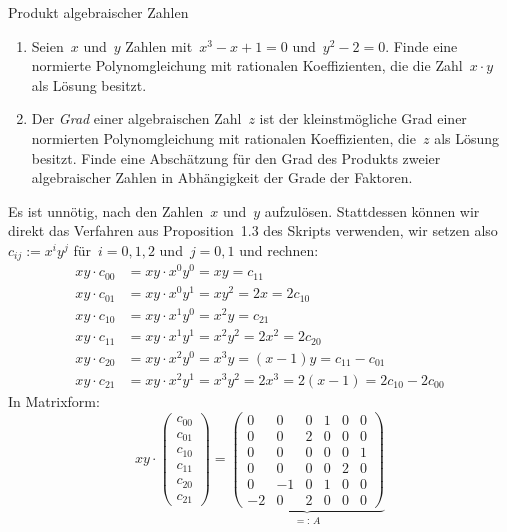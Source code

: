 \documentclass{algblatt}
\begin{document}
\begin{aufgabe}{Produkt algebraischer Zahlen}
\begin{enumerate}
\item Seien~$x$ und~$y$ Zahlen mit~$x^3-x+1=0$ und~$y^2-2=0$.
Finde eine normierte Polynomgleichung mit rationalen
Koeffizienten, die die Zahl~$x \cdot y$ als Lösung besitzt.
\item Der \emph{Grad} einer algebraischen Zahl~$z$ ist der kleinstmögliche Grad
einer normierten Polynomgleichung mit rationalen Koeffizienten, die~$z$ als Lösung
besitzt. Finde eine Abschätzung für den Grad des Produkts zweier algebraischer
Zahlen in Abhängigkeit der Grade der Faktoren.
\end{enumerate}
\begin{loesungE}
\item Es ist unnötig, nach den Zahlen~$x$ und~$y$ aufzulösen. Stattdessen
können wir direkt das Verfahren aus Proposition~1.3 des Skripts verwenden, wir
setzen also $c_{ij} := x^i y^j$ für~$i = 0,1,2$ und~$j = 0,1$ und rechnen:
\begin{align*}
  xy \cdot c_{00} &= xy \cdot x^0 y^0 = xy = c_{11} \\
  xy \cdot c_{01} &= xy \cdot x^0 y^1 = xy^2 = 2x = 2 c_{10} \\
  xy \cdot c_{10} &= xy \cdot x^1 y^0 = x^2y = c_{21} \\
  xy \cdot c_{11} &= xy \cdot x^1 y^1 = x^2y^2 = 2x^2 = 2 c_{20} \\
  xy \cdot c_{20} &= xy \cdot x^2 y^0 = x^3y = (x-1)y = c_{11} - c_{01} \\
  xy \cdot c_{21} &= xy \cdot x^2 y^1 = x^3y^2 = 2x^3 = 2(x-1) = 2 c_{10} - 2 c_{00}
\end{align*}
In Matrixform:
\[
  xy \cdot
  \begin{pmatrix}c_{00}\\c_{01}\\c_{10}\\c_{11}\\c_{20}\\c_{21}\end{pmatrix} =
  \underbrace{\begin{pmatrix}
    0&0&0&1&0&0 \\
    0&0&2&0&0&0 \\
    0&0&0&0&0&1 \\
    0&0&0&0&2&0 \\
    0&-1&0&1&0&0 \\
    -2&0&2&0&0&0
  \end{pmatrix}}_{=:\,A}
\]
\end{loesungE}
\end{aufgabe}
\end{document}
